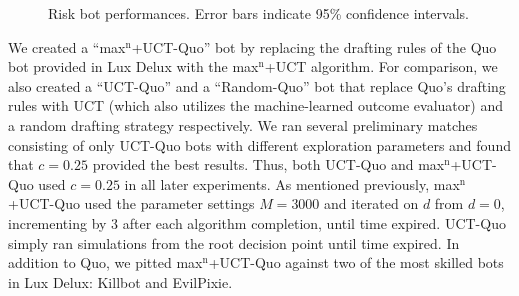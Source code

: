 \documentclass[letterpaper]{article}
\numberwithin{equation}{section}
\numberwithin{theorem}{section}
\numberwithin{lemma}{section}
\numberwithin{df}{section}
\begin{document}
\begin{figure}[t]
{		\label{fig:KthQuoEvilP}
	} %
	\caption[]{Risk bot performances.  Error bars indicate 95\% confidence intervals.}
	\label{fig:RiskResults}
\end{figure}

We created a ``max$^\text{n}$+UCT-Quo'' bot by replacing the drafting rules of the Quo bot provided in Lux Delux with the max$^\text{n}$+UCT algorithm.  For comparison, we also created a ``UCT-Quo''  and a ``Random-Quo'' bot that replace Quo's drafting rules with UCT (which also utilizes the machine-learned outcome evaluator) and a random drafting strategy respectively.  We ran several preliminary matches consisting of only UCT-Quo bots with different exploration parameters and found that $c=0.25$ provided the best results.  Thus, both UCT-Quo and max$^\text{n}$+UCT-Quo used $c=0.25$ in all later experiments.  As mentioned previously, max$^\text{n}$+UCT-Quo used the parameter settings $M = 3000$ and iterated on $d$ from $d=0$, incrementing by 3 after each algorithm completion, until time expired.  UCT-Quo simply ran simulations from the root decision point until time expired.  In addition to Quo, we pitted max$^\text{n}$+UCT-Quo against two of the most skilled bots in Lux Delux: Killbot and EvilPixie.   
\end{document}
